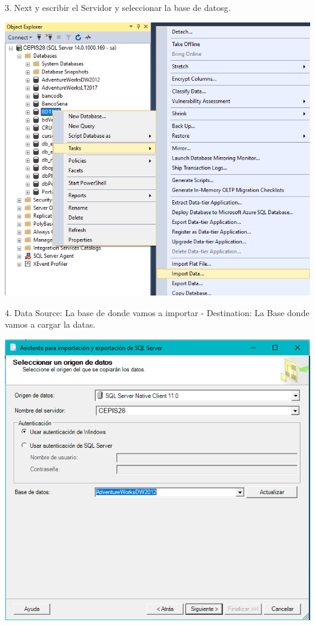 3. Next y escribir el Servidor y seleccionar la base de datosg.
	\begin{center}
	\includegraphics[width=\columnwidth]{images/task1/img3}
	\end{center}	

4. Data Source: La base de donde vamos a importar - Destination: La Base donde vamos a cargar la datas.
	\begin{center}
	\includegraphics[width=\columnwidth]{images/task1/img4}
    \end{center}	
    
